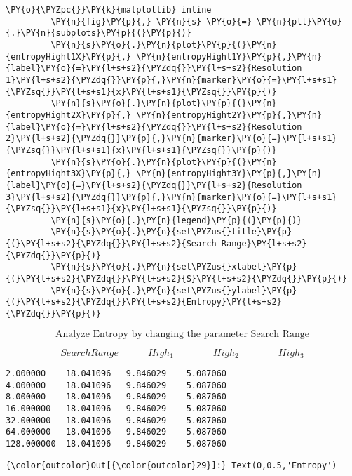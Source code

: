 {\begin{enumerate}
\begin{Verbatim}[commandchars=\\\{\}]
         \PY{o}{\PYZpc{}}\PY{k}{matplotlib} inline
         \PY{n}{fig}\PY{p}{,} \PY{n}{s} \PY{o}{=} \PY{n}{plt}\PY{o}{.}\PY{n}{subplots}\PY{p}{(}\PY{p}{)}
         \PY{n}{s}\PY{o}{.}\PY{n}{plot}\PY{p}{(}\PY{n}{entropyHight1X}\PY{p}{,} \PY{n}{entropyHight1Y}\PY{p}{,}\PY{n}{label}\PY{o}{=}\PY{l+s+s2}{\PYZdq{}}\PY{l+s+s2}{Resolution 1}\PY{l+s+s2}{\PYZdq{}}\PY{p}{,}\PY{n}{marker}\PY{o}{=}\PY{l+s+s1}{\PYZsq{}}\PY{l+s+s1}{x}\PY{l+s+s1}{\PYZsq{}}\PY{p}{)}
         \PY{n}{s}\PY{o}{.}\PY{n}{plot}\PY{p}{(}\PY{n}{entropyHight2X}\PY{p}{,} \PY{n}{entropyHight2Y}\PY{p}{,}\PY{n}{label}\PY{o}{=}\PY{l+s+s2}{\PYZdq{}}\PY{l+s+s2}{Resolution 2}\PY{l+s+s2}{\PYZdq{}}\PY{p}{,}\PY{n}{marker}\PY{o}{=}\PY{l+s+s1}{\PYZsq{}}\PY{l+s+s1}{x}\PY{l+s+s1}{\PYZsq{}}\PY{p}{)}
         \PY{n}{s}\PY{o}{.}\PY{n}{plot}\PY{p}{(}\PY{n}{entropyHight3X}\PY{p}{,} \PY{n}{entropyHight3Y}\PY{p}{,}\PY{n}{label}\PY{o}{=}\PY{l+s+s2}{\PYZdq{}}\PY{l+s+s2}{Resolution 3}\PY{l+s+s2}{\PYZdq{}}\PY{p}{,}\PY{n}{marker}\PY{o}{=}\PY{l+s+s1}{\PYZsq{}}\PY{l+s+s1}{x}\PY{l+s+s1}{\PYZsq{}}\PY{p}{)}
         \PY{n}{s}\PY{o}{.}\PY{n}{legend}\PY{p}{(}\PY{p}{)}
         \PY{n}{s}\PY{o}{.}\PY{n}{set\PYZus{}title}\PY{p}{(}\PY{l+s+s2}{\PYZdq{}}\PY{l+s+s2}{Search Range}\PY{l+s+s2}{\PYZdq{}}\PY{p}{)}   
         \PY{n}{s}\PY{o}{.}\PY{n}{set\PYZus{}xlabel}\PY{p}{(}\PY{l+s+s2}{\PYZdq{}}\PY{l+s+s2}{S}\PY{l+s+s2}{\PYZdq{}}\PY{p}{)}   
         \PY{n}{s}\PY{o}{.}\PY{n}{set\PYZus{}ylabel}\PY{p}{(}\PY{l+s+s2}{\PYZdq{}}\PY{l+s+s2}{Entropy}\PY{l+s+s2}{\PYZdq{}}\PY{p}{)}  
\end{Verbatim}


    $$\text{Analyze Entropy by changing the parameter Search Range}$$

    
    $$Search Range\quad\quad\quad High_1\quad\quad\quad\quad High_2\quad\quad\quad\quad High_3$$

    
    \begin{Verbatim}[commandchars=\\\{\}]
2.000000	18.041096	9.846029	5.087060
4.000000	18.041096	9.846029	5.087060
8.000000	18.041096	9.846029	5.087060
16.000000	18.041096	9.846029	5.087060
32.000000	18.041096	9.846029	5.087060
64.000000	18.041096	9.846029	5.087060
128.000000	18.041096	9.846029	5.087060

    \end{Verbatim}

\begin{Verbatim}[commandchars=\\\{\}]
{\color{outcolor}Out[{\color{outcolor}29}]:} Text(0,0.5,'Entropy')
\end{Verbatim}
            

\end{enumerate}}
